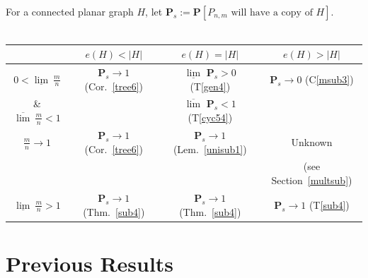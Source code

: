 \documentclass{article}
\newtheorem{Proof of Theorem}{Proof of Theorem}
\begin{document}
For a connected planar graph $H$,
let $\mathbf{P}_{s} := \mathbf{P}[P_{n,m} \textrm{ will have a copy of } H]$. \\
\\
\begin{tabular}{c|c|c|c}
&
$e(H)<|H|$ &
$e(H)=|H|$ &
$e(H) > |H|$ \\
\hline
$0 < \underline{\lim}~\frac{m}{n}$ &
$\mathbf{P}_{s} \to 1$ (Cor.~\ref{tree6}) &
\small{$\underline{\lim}$} $\mathbf{P}_{s} > 0$ (T\ref{gen4}) &
$\mathbf{P}_{s} \to 0$ (C\ref{msub3}) \\
\& $\overline{\lim}~\frac{m}{n} < 1$ &
&
\small{$\overline{\lim}$} $\mathbf{P}_{s} < 1$ (T\ref{cyc54}) &
\\
\hline
$\frac{m}{n} \to 1$ &
$\mathbf{P}_{s} \to 1$ (Cor.~\ref{tree6}) &
$\mathbf{P}_{s} \to 1$ (Lem.~\ref{unisub1}) &
Unknown \\
&
&
&
\small{(see Section~\ref{multsub})} \\
\hline
$\underline{\lim}~\frac{m}{n} > 1$ &
$\mathbf{P}_{s} \to 1$ (Thm.~\ref{sub4}) &
$\mathbf{P}_{s} \to 1$ (Thm.~\ref{sub4}) &
$\mathbf{P}_{s} \to 1$ (T\ref{sub4})
\end{tabular}











































\newpage
\section{Previous Results} \label{previous}
\end{document}

